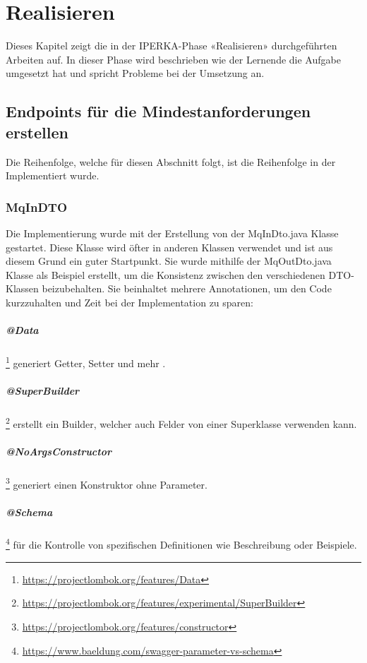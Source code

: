 \chapter{Realisieren}\label{ch:realisieren}
Dieses Kapitel zeigt die in der IPERKA-Phase «Realisieren» durchgeführten Arbeiten auf. In dieser Phase wird beschrieben wie der Lernende die Aufgabe umgesetzt hat und spricht Probleme bei der Umsetzung an.

\section{Endpoints für die Mindestanforderungen erstellen}
Die Reihenfolge, welche für diesen Abschnitt folgt, ist die Reihenfolge in der Implementiert wurde.

\subsection{MqInDTO}
Die Implementierung wurde mit der Erstellung von der MqInDto.java Klasse gestartet. Diese Klasse wird öfter in anderen Klassen verwendet und ist aus diesem Grund ein guter Startpunkt. Sie wurde mithilfe der MqOutDto.java Klasse als Beispiel erstellt, um die Konsistenz zwischen den verschiedenen DTO-Klassen beizubehalten. Sie beinhaltet mehrere Annotationen, um den Code kurzzuhalten und Zeit bei der Implementation zu sparen:

\paragraph{@Data} \footnote{\url{https://projectlombok.org/features/Data}} generiert Getter, Setter und mehr .
\paragraph{@SuperBuilder} \footnote{\url{https://projectlombok.org/features/experimental/SuperBuilder}} erstellt ein Builder, welcher auch Felder von einer Superklasse verwenden kann.
\paragraph{@NoArgsConstructor} \footnote{\url{https://projectlombok.org/features/constructor}} generiert einen Konstruktor ohne Parameter.
\paragraph{@Schema} \footnote{\url{https://www.baeldung.com/swagger-parameter-vs-schema}} für die Kontrolle von spezifischen Definitionen wie Beschreibung oder Beispiele.
